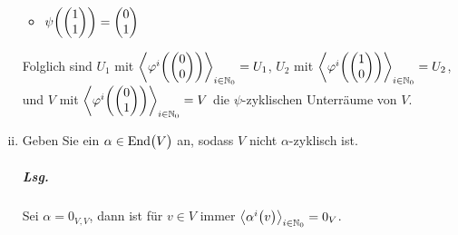 \documentclass{scrreprt}
\newcommand{\End}{\text{End}}
\begin{document}
\begin{enumerate}[(i)]
\begin{multicols}{2}
\begin{itemize}
  \item$\psi\qty(
      \begin{pmatrix}1\\1\end{pmatrix}
    ) = \begin{pmatrix}0\\1\end{pmatrix}$
  \end{itemize}
  \end{multicols}
  Folglich sind $U_1$ mit $\left\langle
    \varphi^i\qty(\begin{pmatrix}0\\0\end{pmatrix})
  \right\rangle_{i \in \mathbb{N}_0} = U_1$,
  $U_2$ mit $\left\langle
    \varphi^i\qty(\begin{pmatrix}1\\0\end{pmatrix})
  \right\rangle_{i \in \mathbb{N}_0} = U_2$,
  und $V$ mit $\left\langle
    \varphi^i\qty(\begin{pmatrix}0\\1\end{pmatrix})
  \right\rangle_{i \in \mathbb{N}_0} = V$ die $\psi$-zyklischen
  Unterräume von $V$.

\item Geben Sie ein $\alpha \in \End\qty\big(V)$ an, sodass $V$ nicht
  $\alpha$-zyklisch ist.

  \subparagraph{Lsg.} Sei $\alpha = 0_{V, V}$, dann ist für $v \in V$ immer
  $\left\langle \alpha^i\qty\big(v) \right\rangle_{i \in \mathbb{N}_0} = 0_V$.
\end{enumerate}
\newpage
\end{document}
